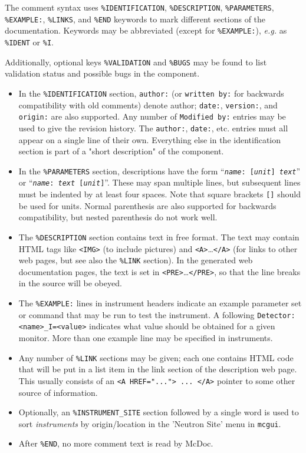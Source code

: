 The comment syntax uses \verb+%IDENTIFICATION+, \verb+%DESCRIPTION+,
\verb+%PARAMETERS+, \verb+%EXAMPLE:+, \verb+%LINKS+, and \verb+%END+
keywords to mark different sections of the documentation. Keywords may
be abbreviated (except for \verb+%EXAMPLE:+), \textit{e.g.} as \verb+%IDENT+ or \verb+%I+.

Additionally, optional keys \verb+%VALIDATION+ and \verb+%BUGS+ may be found to list validation status and possible bugs in the component.

\begin{itemize}
\item In the \verb+%IDENTIFICATION+
  section, \verb+author:+ (or \verb+written by:+ for backwards
  compatibility with old comments) denote author; \verb+date:+,
  \verb+version:+, and \verb+origin:+ are also supported. Any number of
  \verb+Modified by:+ entries may be used to give the revision history.
  The \verb+author:+, \verb+date:+, etc. entries must all
  appear on a single line of their own. Everything else in the
  identification section is part of a "short description" of the
  component.
\item In the \verb+%PARAMETERS+
  section, descriptions have the form
  \hbox{``\texttt{{\it name\/}:~[{\it unit\/}] {\it text\/}}''}
  or \hbox{``\texttt{{\it name\/}:~{\it text\/} [{\it unit\/}]}''}.
  These may span multiple lines, but subsequent lines must be
  indented by at least four spaces. Note that square brackets \verb+[]+ should
  be used for units. Normal parenthesis are also supported for backwards
  compatibility, but nested parenthesis do not work well.
\item The \verb+%DESCRIPTION+
  section contains text in free format. The text may contain HTML tags
  like \verb+<IMG>+ (to include pictures) and
  \verb+<A>+\ldots\verb+</A>+
  (for links to other web pages, but see also the \verb+%LINK+
  section). In the generated web documentation pages, the text is set in
  \verb+<PRE>+\ldots\verb+</PRE>+, so that the line breaks in the source
  will be obeyed.
\item The \verb+%EXAMPLE:+
  lines in instrument headers indicate an example parameter set or command that may be
  run to test the instrument. A following \verb+Detector: <name>_I=<value>+
  indicates what value should be obtained for a given monitor. More than one example 
  line may be specified in instruments.
\item Any number of \verb+%LINK+
  sections may be given; each one contains HTML code that will be put in
  a list item in the link section of the description web page. This
  usually consists of an \verb+<A HREF="..."> ... </A>+ pointer to some
  other source of information.
\item Optionally, an \verb+%INSTRUMENT_SITE+ section followed by a single word is used to sort \emph{instruments} by origin/location in the 'Neutron Site' menu in \verb+mcgui+.
\item After \verb+%END+, no more comment text is read by McDoc.
\end{itemize}
